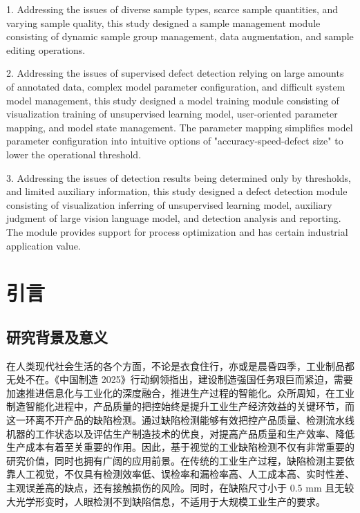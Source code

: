 \documentclass[
  ]{njuthesis}
\begin{document}
\begin{abstract*}
1. Addressing the issues of diverse sample types, scarce sample quantities, and varying sample quality, this study designed a sample management module consisting of dynamic sample group management, data augmentation, and sample editing operations.

2. Addressing the issues of supervised defect detection relying on large amounts of annotated data, complex model parameter configuration, and difficult system model management, this study designed a model training module consisting of visualization training of unsupervised learning model, user-oriented parameter mapping, and model state management. The parameter mapping simplifies model parameter configuration into intuitive options of "accuracy-speed-defect size" to lower the operational threshold.

3. Addressing the issues of detection results being determined only by thresholds, and limited auxiliary information, this study designed a defect detection module consisting of visualization inferring of unsupervised learning model, auxiliary judgment of large vision language model, and detection analysis and reporting. The module provides support for process optimization and has certain industrial application value.
\end{abstract*}

\tableofcontents
\listoffigures
\listoftables

\mainmatter

\chapter{引言}

\section{研究背景及意义}

在人类现代社会生活的各个方面，不论是衣食住行，亦或是晨昏四季，工业制品都无处不在。《中国制造 2025》行动纲领指出，建设制造强国任务艰巨而紧迫，需要加速推进信息化与工业化的深度融合，推进生产过程的智能化\cite{[1]}。众所周知，在工业制造智能化进程中，产品质量的把控始终是提升工业生产经济效益的关键环节，而这一环离不开产品的缺陷检测。通过缺陷检测能够有效把控产品质量、检测流水线机器的工作状态以及评估生产制造技术的优良，对提高产品质量和生产效率、降低生产成本有着至关重要的作用\cite{[2]}。因此，基于视觉的工业缺陷检测不仅有非常重要的研究价值，同时也拥有广阔的应用前景\cite{[1]}。在传统的工业生产过程，缺陷检测主要依靠人工视觉，不仅具有检测效率低、误检率和漏检率高、人工成本高、实时性差、主观误差高的缺点，还有接触损伤的风险\cite{[3]}。同时，在缺陷尺寸小于 0.5 mm 且无较大光学形变时，人眼检测不到缺陷信息，不适用于大规模工业生产的要求\cite{[4]}。
\end{document}
